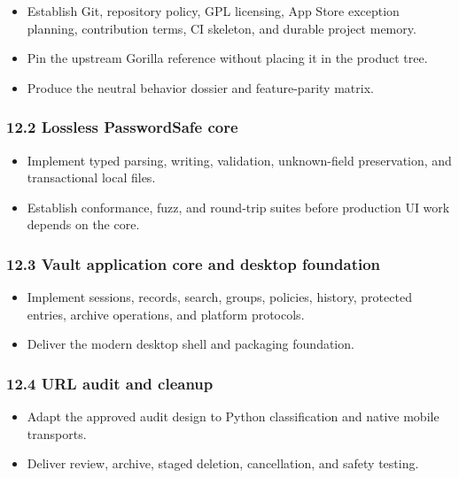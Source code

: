 \documentclass[
  letterpaper,
]{article}
\providecommand{\tightlist}{%
  \setlength{\itemsep}{0pt}\setlength{\parskip}{0pt}}
\begin{document}
\begin{itemize}
\tightlist
\item
  Establish Git, repository policy, GPL licensing, App Store exception planning, contribution terms, CI skeleton, and
  durable project memory.
\item
  Pin the upstream Gorilla reference without placing it in the product tree.
\item
  Produce the neutral behavior dossier and feature-parity matrix.
\end{itemize}

\subsubsection{12.2 Lossless PasswordSafe core}\label{122-lossless-passwordsafe-core}

\begin{itemize}
\tightlist
\item
  Implement typed parsing, writing, validation, unknown-field preservation, and transactional local files.
\item
  Establish conformance, fuzz, and round-trip suites before production UI work depends on the core.
\end{itemize}

\subsubsection{12.3 Vault application core and desktop
foundation}\label{123-vault-application-core-and-desktop-foundation}

\begin{itemize}
\tightlist
\item
  Implement sessions, records, search, groups, policies, history, protected entries, archive operations, and platform
  protocols.
\item
  Deliver the modern desktop shell and packaging foundation.
\end{itemize}

\subsubsection{12.4 URL audit and cleanup}\label{124-url-audit-and-cleanup}

\begin{itemize}
\tightlist
\item
  Adapt the approved audit design to Python classification and native mobile transports.
\item
  Deliver review, archive, staged deletion, cancellation, and safety testing.
\end{itemize}
\end{document}
